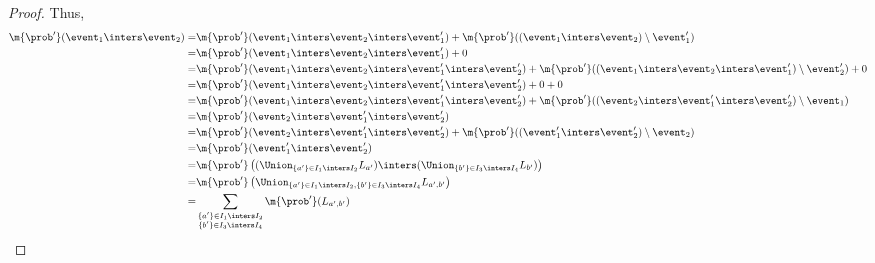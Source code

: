 \documentclass[acmsmall,nonacm,screen,appendix]{acmart}
\begin{document}
\begin{proof}
      Thus,
      \begin{align*}
         \m{\prob'}(\event_1 \inters \event_2)
        =& \m{\prob'}(\event_1 \inters \event_2 \inters \event'_1)
        + \m{\prob'}((\event_1 \inters \event_2) \setminus \event'_1)\\
        =& \m{\prob'}(\event_1 \inters \event_2 \inters \event'_1)
        + 0 \\
        =& \m{\prob'}(\event_1 \inters \event_2 \inters \event'_1 \inters \event'_2) + \m{\prob'}((\event_1 \inters \event_2 \inters \event'_1) \setminus \event'_2) + 0 \\
        =& \m{\prob'}(\event_1 \inters \event_2 \inters \event'_1 \inters \event'_2) + 0 + 0 \\
        =&  \m{\prob'}(\event_1 \inters \event_2 \inters \event'_1 \inters \event'_2) +  \m{\prob'}((\event_2 \inters \event'_1 \inters \event'_2 ) \setminus \event_1) \\
        =&  \m{\prob'}(\event_2 \inters \event'_1 \inters \event'_2)  \\
        =&  \m{\prob'}(\event_2 \inters \event'_1 \inters \event'_2) + \m{\prob'}((\event'_1 \inters \event'_2 ) \setminus \event_2) \\
        =&  \m{\prob'}(\event'_1 \inters \event'_2) \\
        =&  \m{\prob'}\left((\Union_{\{a'\} \in I_1 \inters I_2} L_{a'}) \inters (\Union_{\{b'\} \in I_3 \inters I_4} L_{b'})\right) \\
         =&  \m{\prob'}\left(\Union_{\{a'\} \in I_1 \inters I_2, \{b'\} \in I_3 \inters I_4} L_{a', b'}\right) \\
         =&  \sum_{\substack{\{a'\} \in I_1 \inters I_2 \\ \{b'\} \in I_3 \inters I_4}} \m{\prob'}(L_{a', b'})
       \end{align*}


\end{proof}
\end{document}
